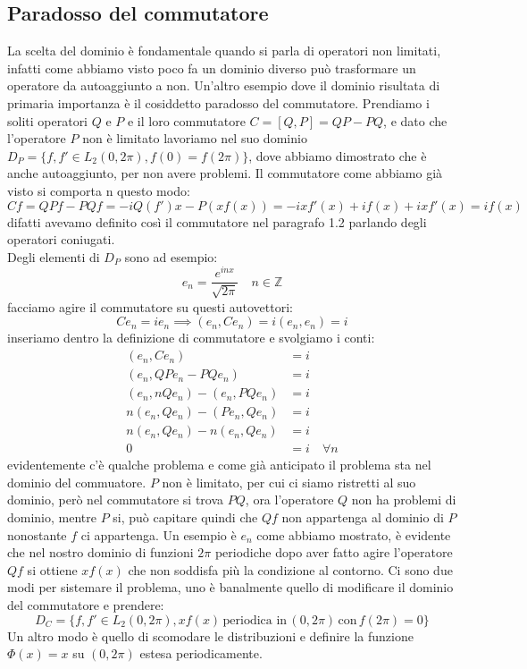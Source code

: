 \documentclass[12pt]{book}
\theoremstyle{plain}
\theoremstyle{definition}
\theoremstyle{remark}
\begin{document}
\subsection{Paradosso del commutatore}
La scelta del dominio è fondamentale quando si parla di operatori non limitati, infatti come abbiamo visto poco fa un dominio diverso può trasformare un operatore da autoaggiunto a non. Un'altro esempio dove il dominio risultata di primaria importanza è il cosiddetto paradosso del commutatore. Prendiamo i soliti operatori $Q$ e $P$ e il loro commutatore $C = [Q,P] = QP-PQ$, e dato che l'operatore $P$ non è limitato lavoriamo nel suo dominio $D_P = \{f,f'\in L_2(0,2\pi),f(0) = f(2\pi)\}$, dove abbiamo dimostrato che è anche autoaggiunto, per non avere problemi. Il commutatore come abbiamo già visto si comporta n questo modo:
\[Cf = QPf-PQf = -iQ(f')x - P(xf(x)) = -ixf'(x) + if(x) + ixf'(x) = if(x)\]
difatti avevamo definito così il commutatore nel paragrafo 1.2 parlando degli operatori coniugati.\\
Degli elementi di $D_P$ sono ad esempio:
\[e_n = \frac{e^{inx}}{\sqrt{2\pi}}\quad n\in\mathbb{Z}\]
facciamo agire il commutatore su questi autovettori:
\[Ce_n = ie_n \implies (e_n, Ce_n) = i(e_n,e_n) = i\]
inseriamo dentro la definizione di commutatore e svolgiamo i conti:
\begin{align*} 
(e_n, Ce_n) &=  i \\ 
(e_n, QPe_n-PQe_n) &= i\\ 
(e_n, nQe_n)-(e_n,PQe_n) &= i\\ 
n(e_n, Qe_n)-(Pe_n,Qe_n) &= i\\ 
n(e_n, Qe_n)-n(e_n,Qe_n) &= i\\
0&= i \quad \forall n
\end{align*}
evidentemente c'è qualche problema e come già anticipato il problema sta nel dominio del commuatore. $P$ non è limitato, per cui ci siamo ristretti al suo dominio, però nel commutatore si trova $PQ$, ora l'operatore $Q$ non ha problemi di dominio, mentre $P$ si, può capitare quindi che $Qf$ non appartenga al dominio di $P$ nonostante $f$ ci appartenga. Un esempio è $e_n$ come abbiamo mostrato, è evidente che nel nostro dominio di funzioni $2\pi$ periodiche dopo aver fatto agire l'operatore $Qf$ si ottiene $xf(x)$ che non soddisfa più la condizione al contorno. Ci sono due modi per sistemare il problema, uno è banalmente quello di modificare il dominio del commutatore e prendere:
\[D_C = \{f,f'\in L_2(0,2\pi),xf(x)\,\text{periodica in}\, (0,2\pi)\, \text{con}\, f(2\pi) = 0\}\]
Un altro modo è quello di scomodare le distribuzioni e definire la funzione $\Phi(x) = x$ su $(0,2\pi)$ estesa periodicamente.
\end{document}
